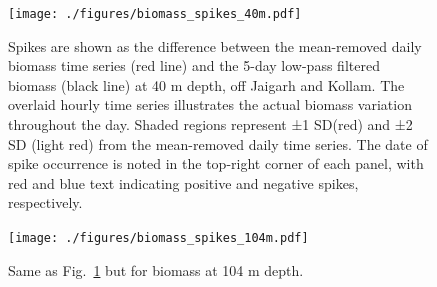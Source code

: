 \documentclass[12pt,a4paper]{article}
\begin{document}
\begin{figure}[htbp]
	\centering
	\texttt{[image: ./figures/biomass\_spikes\_40m.pdf]} 
	\caption{Spikes are shown as the difference between the mean-removed daily biomass time series (red line) and the 5-day low-pass filtered biomass (black line) at 40 m depth, off Jaigarh and Kollam. The overlaid hourly time series illustrates the actual biomass variation throughout the day. Shaded regions represent ±1 SD(red) and ±2 SD (light red) from the mean-removed daily time series. The date of spike occurrence is noted in the top-right corner of each panel, with red and blue text indicating positive and negative spikes, respectively.}
	\label{fig:biomass_spike_40m}
\end{figure}

\begin{figure}[htbp]
	\centering
	\texttt{[image: ./figures/biomass\_spikes\_104m.pdf]} 
	\caption{Same as Fig.~\ref{fig:biomass_spike_40m} but for biomass at 104 m depth.}
	\label{fig:biomass_spike_104m}
\end{figure}
\end{document}
